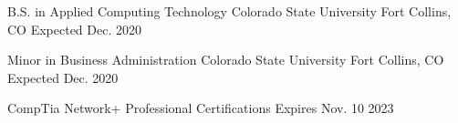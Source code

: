 



\begin{cventries}
  \cventry
    {B.S. in Applied Computing Technology} %
    {Colorado State University} %
    {Fort Collins, CO} %
    {Expected Dec. 2020} %
    {}

    \cventry
    {Minor in Business Administration} %
    {Colorado State University} %
    {Fort Collins, CO} %
    {Expected Dec. 2020} %
    {}

  \certentry
    {CompTia Network+} %
    {Professional Certifications} %
    {Expires Nov. 10 2023} %
	{ }
	{ }
\end{cventries}
